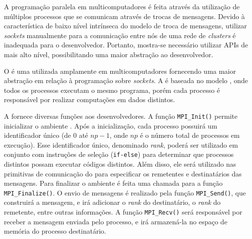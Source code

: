 %
%
%

A programação paralela em multicomputadores é feita através da utilização de múltiplos processos que se comunicam
através de trocas de mensagens. Devido à característica de baixo nível intrínseca do modelo de troca de
mensagens, utilizar \textit{sockets} manualmente para a comunicação entre nós de
uma rede de \textit{clusters} é inadequada para o desenvolvedor. Portanto, mostra-se necessário utilizar
APIs de mais alto nível, possibilitando uma maior abstração ao desenvolvedor.

O \mpi é uma \api utilizada amplamente em multicomputadores fornecendo uma maior
abstração em relação à programação sobre \textit{sockets}. A \api é baseada no
modelo \spmd, onde todos os processos executam o mesmo programa, porém cada processo é responsável
por realizar computações em dados distintos.

A \api fornece diversas funções aos desenvolvedores. A função \texttt{MPI\_Init()} permite inicializar o ambiente \mpi.
Após a inicialização, cada processo \mpi possuirá um identificador único (de $0$ até $np-1$, onde $np$ é o número total
de processos \mpi em execução). Esse identificador único, denominado \textit{rank}, poderá ser utilizado em conjunto com
instruções de seleção (\texttt{if-else}) para determinar que processos \mpi
distintos possam executar códigos distintos. Além disso,
ele será utilizado nas primitivas de comunicação do \mpi para especificar os remetentes e destinatários das mensagens.
Para finalizar o ambiente \mpi é feita uma chamada para a função \texttt{MPI\_Finalize()}. O envio de mensagens
é realizado pela função \texttt{MPI\_Send()}, que construirá a mensagem, e irá
adicionar o \textit{rank} do destinatário, o \textit{rank} do remetente, entre
outras informações. A função \texttt{MPI\_Recv()} será responsável por receber a
mensagem enviada pelo processo, e irá armazená-la no espaço de memória
do processo destinatário.

